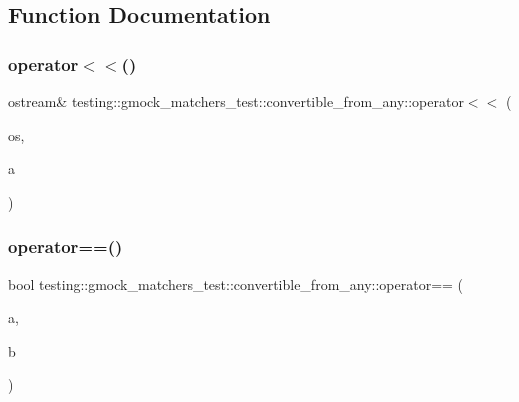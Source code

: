 \subsection{Function Documentation}
\mbox{\label{namespacetesting_1_1gmock__matchers__test_1_1convertible__from__any_a8bc42601c60dc9c5e42861c922d63e64}} 
\subsubsection{\texorpdfstring{operator$<$$<$()}{operator<<()}}
{\footnotesize\ttfamily ostream\& testing\+::gmock\+\_\+matchers\+\_\+test\+::convertible\+\_\+from\+\_\+any\+::operator$<$$<$ (\begin{DoxyParamCaption}\item[{ostream \&}]{os,  }\item[{const \mbox{\hyperlink{structtesting_1_1gmock__matchers__test_1_1convertible__from__any_1_1ConvertibleFromAny}{Convertible\+From\+Any}} \&}]{a }\end{DoxyParamCaption})}

\mbox{\label{namespacetesting_1_1gmock__matchers__test_1_1convertible__from__any_a11d27383932d6907ea215955a8dacc3b}} 
\subsubsection{\texorpdfstring{operator==()}{operator==()}}
{\footnotesize\ttfamily bool testing\+::gmock\+\_\+matchers\+\_\+test\+::convertible\+\_\+from\+\_\+any\+::operator== (\begin{DoxyParamCaption}\item[{const \mbox{\hyperlink{structtesting_1_1gmock__matchers__test_1_1convertible__from__any_1_1ConvertibleFromAny}{Convertible\+From\+Any}} \&}]{a,  }\item[{const \mbox{\hyperlink{structtesting_1_1gmock__matchers__test_1_1convertible__from__any_1_1ConvertibleFromAny}{Convertible\+From\+Any}} \&}]{b }\end{DoxyParamCaption})}

